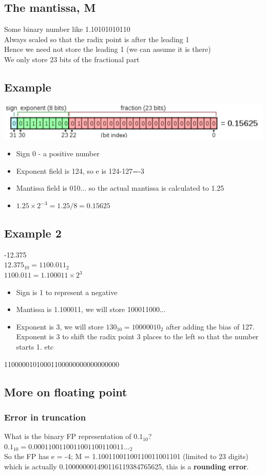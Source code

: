 \documentclass{article}[18pt]
\begin{document}
\subsection{The mantissa, M}
Some binary number like 1.10101010110\\
Always scaled so that the radix point is after the leading 1\\
Hence we need not store the leading 1 (we can assume it is there)\\
We only store 23 bits of the fractional part
\subsection{Example}
\includegraphics[width=\textwidth]{float.png}
\begin{itemize}
\item Sign 0 - a positive number
\item Exponent field is 124, so e is 124-127=-3
\item Mantissa field is 010... so the actual mantissa is calculated to 1.25
\item $1.25\times2^{-3}=1.25/8=0.15625$
\end{itemize}
\subsection{Example 2}
-12.375\\
$12.375_{10}=1100.011_2$\\
$1100.011 = 1.100011\times 2^3$
\begin{itemize}
\item Sign is 1 to represent a negative
\item Mantissa is 1.100011, we will store 100011000...
\item Exponent is 3, we will store $130_{10}=1000 0010_2$ after adding the bias of 127. Exponent is 3 to shift the radix point 3 places to the left so that the number starts 1. etc
\end{itemize}
11000001010001100000000000000000
\subsection{More on floating point}
\subsubsection{Error in truncation}
What is the binary FP representation of $0.1_{10}$?\\
$0.1_{10} = 0.0001100110011001100110011…_2$\\
So the FP has e = -4; M = 1.10011001100110011001101 (limited to 23 digits)\\
which is actually 0.100000001490116119384765625, this is a \textbf{rounding error}.\\
\end{document}
